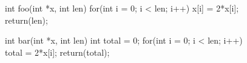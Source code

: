\noindent
\begin{figure}[ht]
\begin{minipage}[t]{0.45\linewidth}
\centering
\begin{CCode}
int
foo(int *x, int len)
{
    for(int i = 0; i < len; i++)
	x[i] = 2*x[i];
    return(len);
}

\end{CCode}
\caption{}
\label{fig:Mutability1}
\end{minipage}
\hspace{0.5cm}
\begin{minipage}[t]{0.45\linewidth}
\centering
\begin{CCode}
int
bar(int *x, int len)
{
    int total = 0;
    for(int i = 0; i < len; i++)
	total = 2*x[i];
    return(total);
}
\end{CCode}
\caption{}
\label{fig:Mutability2}
\end{minipage}
\end{figure}
